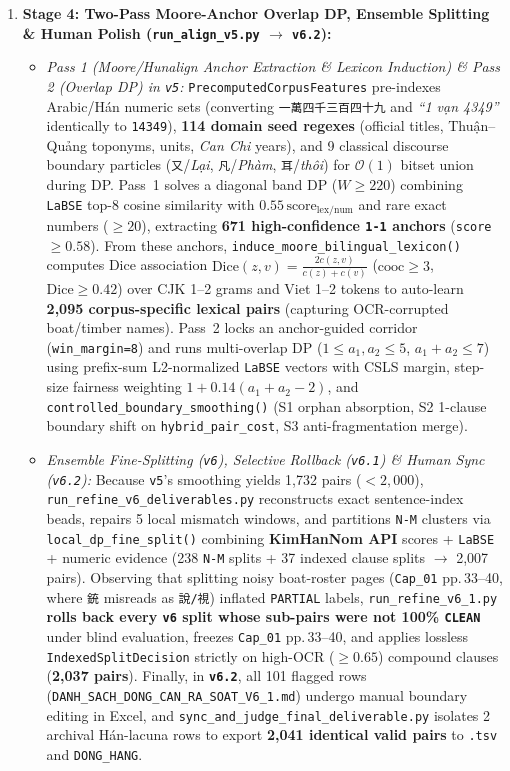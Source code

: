 \documentclass[a4paper]{article}
\begin{document}
\begin{enumerate}
  \item \textbf{Stage 4: Two-Pass Moore-Anchor Overlap DP, Ensemble Splitting \& Human Polish (\texttt{run\_align\_v5.py} $\to$ \texttt{v6.2}):}
  \begin{itemize}
    \item \textit{Pass 1 (Moore/Hunalign Anchor Extraction \& Lexicon Induction) \& Pass 2 (Overlap DP) in \texttt{v5}:} \texttt{PrecomputedCorpusFeatures} pre-indexes Arabic/Hán numeric sets (converting \texttt{一萬四千三百四十九} and \textit{``1 vạn 4349''} identically to \texttt{14349}), \textbf{114 domain seed regexes} (official titles, Thuận--Quảng toponyms, units, \textit{Can Chi} years), and 9 classical discourse boundary particles (\texttt{又}/\textit{Lại}, \texttt{凡}/\textit{Phàm}, \texttt{耳}/\textit{thôi}) for $\mathcal{O}(1)$ bitset union during DP. Pass~1 solves a diagonal band DP ($W\ge 220$) combining \texttt{LaBSE} top-8 cosine similarity with $0.55\,\text{score}_{\text{lex/num}}$ and rare exact numbers ($\ge 20$), extracting \textbf{671 high-confidence \texttt{1-1} anchors} (\texttt{score $\ge 0.58$}). From these anchors, \texttt{induce\_moore\_bilingual\_lexicon()} computes Dice association $\text{Dice}(z,v)=\frac{2c(z,v)}{c(z)+c(v)}$ ($\text{cooc}\ge 3$, $\text{Dice}\ge 0.42$) over CJK 1--2 grams and Viet 1--2 tokens to auto-learn \textbf{2,095 corpus-specific lexical pairs} (capturing OCR-corrupted boat/timber names). Pass~2 locks an anchor-guided corridor (\texttt{win\_margin=8}) and runs multi-overlap DP ($1\le a_1,a_2\le 5$, $a_1{+}a_2\le 7$) using prefix-sum L2-normalized \texttt{LaBSE} vectors with CSLS margin, step-size fairness weighting $1+0.14(a_1{+}a_2-2)$, and \texttt{controlled\_boundary\_smoothing()} (S1 orphan absorption, S2 1-clause boundary shift on \texttt{hybrid\_pair\_cost}, S3 anti-fragmentation merge).
    \item \textit{Ensemble Fine-Splitting (\texttt{v6}), Selective Rollback (\texttt{v6.1}) \& Human Sync (\texttt{v6.2}):} Because \texttt{v5}'s smoothing yields 1,732 pairs ($<2{,}000$), \texttt{run\_refine\_v6\_deliverables.py} reconstructs exact sentence-index beads, repairs 5 local mismatch windows, and partitions \texttt{N-M} clusters via \texttt{local\_dp\_fine\_split()} combining \textbf{KimHanNom API} scores + \texttt{LaBSE} + numeric evidence (238 \texttt{N-M} splits + 37 indexed clause splits $\to$ 2,007 pairs). Observing that splitting noisy boat-roster pages (\texttt{Cap\_01} pp.\,33--40, where \texttt{銃} misreads as \texttt{說/視}) inflated \texttt{PARTIAL} labels, \texttt{run\_refine\_v6\_1.py} \textbf{rolls back every \texttt{v6} split whose sub-pairs were not 100\% \texttt{CLEAN}} under blind evaluation, freezes \texttt{Cap\_01} pp.\,33--40, and applies lossless \texttt{IndexedSplitDecision} strictly on high-OCR ($\ge 0.65$) compound clauses (\textbf{2,037 pairs}). Finally, in \textbf{\texttt{v6.2}}, all 101 flagged rows (\texttt{DANH\_SACH\_DONG\_CAN\_RA\_SOAT\_V6\_1.md}) undergo manual boundary editing in Excel, and \texttt{sync\_and\_judge\_final\_deliverable.py} isolates 2 archival Hán-lacuna rows to export \textbf{2,041 identical valid pairs} to \texttt{.tsv} and \texttt{DONG\_HANG}.
  \end{itemize}
\end{enumerate}
\end{document}
